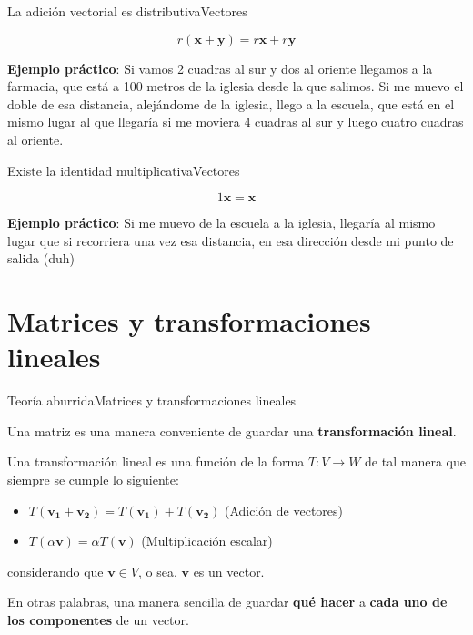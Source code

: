 \documentclass[spanish, c]{beamer}
\begin{document}
\begin{frame}{La adición vectorial es distributiva}{Vectores}
    
    $$r(\mathbf{x} + \mathbf{y}) = r\mathbf{x} + r\mathbf{y}$$

    \textbf{Ejemplo práctico}: Si vamos 2 cuadras al sur y dos al oriente llegamos a la farmacia, que está a 100 metros de la iglesia desde la que salimos. Si me muevo el doble de esa distancia, alejándome de la iglesia, llego a la escuela, que está en el mismo lugar al que llegaría si me moviera 4 cuadras al sur y luego cuatro cuadras al oriente.
\end{frame}

\begin{frame}{Existe la identidad multiplicativa}{Vectores}

    $$1\mathbf{x} = \mathbf{x}$$

    \textbf{Ejemplo práctico}: Si me muevo de la escuela a la iglesia, llegaría al mismo lugar que si recorriera una vez esa distancia, en esa dirección desde mi punto de salida (duh)

\end{frame}

\section{Matrices y transformaciones lineales}

\begin{frame}{Teoría aburrida}{Matrices y transformaciones lineales}    
    \begin{definition}
        Una \alert{matriz} es una manera conveniente de guardar una \textbf{transformación lineal}.
    \end{definition}

    \begin{definition}
        Una \alert{transformación lineal} es una función de la forma $T: V \to W$ de tal manera que siempre se cumple lo siguiente:

        \begin{itemize}
            \item $T(\mathbf{v_1} + \mathbf{v_2}) = T(\mathbf{v_1}) + T(\mathbf{v_2})$ \quad (Adición de vectores)
            \item $T(\alpha\mathbf{v}) = \alpha T(\mathbf{v})$ \quad (Multiplicación escalar)
        \end{itemize}

        considerando que $\mathbf{v} \in V$, o sea, $\mathbf{v}$ es un vector.
    \end{definition}

    \bigskip

    En otras palabras, una manera sencilla de guardar \textbf{qué hacer} a \textbf{cada uno de los componentes} de un vector.
\end{frame}
\end{document}
